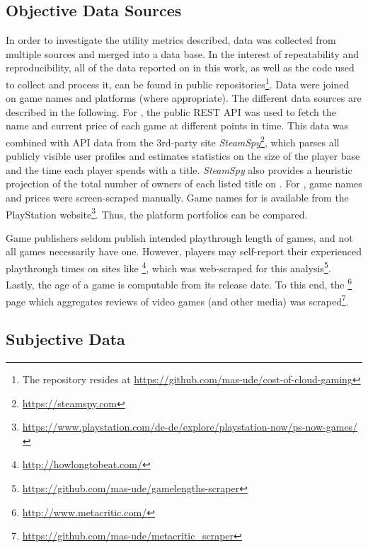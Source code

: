 \subsection{Objective Data Sources}
In order to investigate the utility metrics described, data was collected from
multiple sources and merged
into a data base. In the interest of repeatability and
reproducibility, all of the data reported on in this work, as well as
the code used to collect and process it, can be found in public
repositories\footnote{The repository resides at \url{https://github.com/mas-ude/cost-of-cloud-gaming}}.
Data were joined on game names and platforms (where appropriate).
The different data sources are described in the following.
For \steam, the public \acrshort{REST} \acrshort{API} was used to
fetch the name and current price of each game at different points in
time.
This data was combined with \acrshort{API} data from the 3rd-party site
\textit{SteamSpy}\footnote{\url{https://steamspy.com}}, which parses all
publicly visible \steam user profiles and
estimates statistics on the size of the player base and the time each
player spends with a title. \textit{SteamSpy} also provides a heuristic
projection of the total number of owners of each listed title on \steam.
For \gfnow, game names and prices were screen-scraped manually.
Game names for \psnow is available from the PlayStation
website\footnote{\url{https://www.playstation.com/de-de/explore/playstation-now/ps-now-games/}}.
Thus, the platform portfolios can be compared.

Game publishers seldom publish intended playthrough
length of games, and not all games necessarily have one. However, players
may self-report their experienced playthrough times on sites like
\hltb\footnote{\url{http://howlongtobeat.com/}}, which was web-scraped
for this analysis\footnote{\url{https://github.com/mas-ude/gamelengths-scraper}}.
Lastly, the age of a game is computable from its release date. To this end, the
\metacritic\footnote{\url{http://www.metacritic.com/}} page which
aggregates reviews of video games (and other media) was
scraped\footnote{\url{https://github.com/mas-ude/metacritic_scraper}}.



\subsection{Subjective Data}


